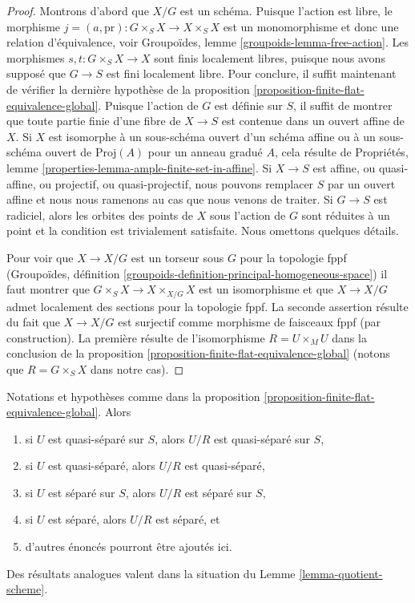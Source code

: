 \begin{proof}
Montrons d'abord que $X/G$ est un schéma. Puisque l'action est libre, le morphisme
$j = (a, \text{pr}) : G \times_S X \to X \times_S X$
est un monomorphisme et donc une relation d'équivalence, voir
Groupoïdes, lemme \ref{groupoids-lemma-free-action}. Les morphismes
$s, t : G \times_S X \to X$
sont finis localement libres, puisque nous avons supposé que $G \to S$ est fini localement
libre. Pour conclure, il suffit maintenant de vérifier la dernière hypothèse de la
proposition \ref{proposition-finite-flat-equivalence-global}.
Puisque l'action de $G$ est définie sur $S$, il suffit de montrer que
toute partie finie d'une fibre de $X \to S$ est contenue dans un
ouvert affine de $X$. Si $X$ est isomorphe à un sous-schéma ouvert d'un
schéma affine ou à un sous-schéma ouvert de $\text{Proj}(A)$
pour un anneau gradué $A$, cela résulte de
Propriétés, lemme \ref{properties-lemma-ample-finite-set-in-affine}.
Si $X \to S$ est affine, ou quasi-affine, ou projectif, ou
quasi-projectif, nous pouvons remplacer $S$ par un ouvert affine et nous
nous ramenons au cas que nous venons de traiter. Si $G \to S$ est radiciel,
alors les orbites des points de $X$ sous l'action de $G$ sont réduites à un point
et la condition est trivialement satisfaite. Nous omettons quelques détails.

\medskip\noindent
Pour voir que $X \to X/G$ est un torseur sous $G$ pour la topologie fppf
(Groupoïdes, définition \ref{groupoids-definition-principal-homogeneous-space})
il faut montrer que $G \times_S X \to X \times_{X/G} X$
est un isomorphisme et que $X \to X/G$ admet localement des sections pour la topologie fppf.
La seconde assertion résulte du fait que $X \to X/G$ est surjectif
comme morphisme de faisceaux fppf (par construction). La première résulte de
l'isomorphisme $R = U \times_M U$ dans la conclusion de la
proposition \ref{proposition-finite-flat-equivalence-global}
(notons que $R = G \times_S X$ dans notre cas).
\end{proof}

\begin{lemma}
\label{lemma-quotient-separated}
Notations et hypothèses comme dans la
proposition \ref{proposition-finite-flat-equivalence-global}. Alors
\begin{enumerate}
\item si $U$ est quasi-séparé sur $S$, alors $U/R$ est quasi-séparé
sur $S$,
\item si $U$ est quasi-séparé, alors $U/R$ est quasi-séparé,
\item si $U$ est séparé sur $S$, alors $U/R$ est séparé sur $S$,
\item si $U$ est séparé, alors $U/R$ est séparé, et
\item d'autres énoncés pourront être ajoutés ici.
\end{enumerate}
Des résultats analogues valent dans la situation du Lemme \ref{lemma-quotient-scheme}.
\end{lemma}

